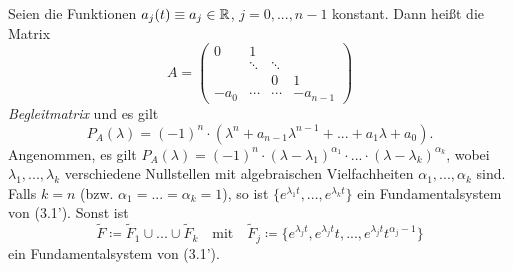 \documentclass{cheat-sheet}
\begin{document}
\begin{bem}
  Seien die Funktionen $a_j(t) \equiv a_j \in \mathbb{R}$, $j = 0, ..., n-1$ konstant. Dann heißt die Matrix
  \[
    A = \begin{pmatrix}
      0 & 1 && \\
      & \ddots & \ddots & \\
      && 0 & 1\\
      - a_0 & \cdots & \cdots & -a_{n-1}
    \end{pmatrix}
  \]
  \emph{Begleitmatrix} und es gilt
  \[ P_A(\lambda) = (-1)^n \cdot (\lambda^n + a_{n-1} \lambda^{n-1} + ... + a_1 \lambda + a_0). \]
  Angenommen, es gilt $P_A(\lambda) = (-1)^n \cdot (\lambda - \lambda_1)^{\alpha_1} \cdot ... \cdot (\lambda - \lambda_k)^{\alpha_k}$, wobei $\lambda_1, ..., \lambda_k$ verschiedene Nullstellen mit algebraischen Vielfachheiten $\alpha_1, ..., \alpha_k$ sind.
  Falls $k = n$ (bzw. $\alpha_1 = ... = \alpha_k = 1$), so ist $\{ e^{\lambda_1 t}, ..., e^{\lambda_k t} \}$ ein Fundamentalsystem von (3.1'). Sonst ist
  \[
    \tilde{F} \coloneqq \tilde{F}_1 \cup ... \cup \tilde{F}_k
    \quad \text{mit} \quad
    \tilde{F}_j \coloneqq \{ e^{\lambda_j t}, e^{\lambda_j t} t, ..., e^{\lambda_j t} t^{\alpha_j - 1} \}
  \]
  ein Fundamentalsystem von (3.1').
\end{bem}

\end{document}
